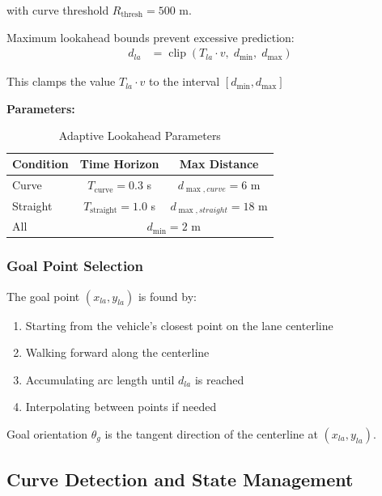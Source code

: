 \documentclass[12pt]{article}
\begin{document}
with curve threshold $R_{\text{thresh}} = 500$ m.

Maximum lookahead bounds prevent excessive prediction:
\begin{equation}
\begin{split}
d_{la} &= \operatorname{clip}\!\left(T_{la} \cdot v, \; d_{\min}, \; d_{\max}\right)
\end{split}
\end{equation}

This clamps the value \(T_{la} \cdot v\) to the interval \([d_{\min},d_{\max}]\)

\textbf{Parameters:}
\begin{table}[H]
\centering
\begin{tabular}{lcc}
\toprule
\textbf{Condition} & \textbf{Time Horizon} & \textbf{Max Distance} \\
\midrule
Curve & $T_{\text{curve}} = 0.3$ s & $d_{\max,curve} = 6$ m \\
Straight & $T_{\text{straight}} = 1.0$ s & $d_{\max,straight} = 18$ m \\
\midrule
All & \multicolumn{2}{c}{$d_{\min} = 2$ m} \\
\bottomrule
\end{tabular}
\caption{Adaptive Lookahead Parameters}
\end{table}

\subsubsection{Goal Point Selection}

The goal point $(x_{la}, y_{la})$ is found by:
\begin{enumerate}
    \item Starting from the vehicle's closest point on the lane centerline
    \item Walking forward along the centerline
    \item Accumulating arc length until $d_{la}$ is reached
    \item Interpolating between points if needed
\end{enumerate}

Goal orientation $\theta_g$ is the tangent direction of the centerline at $(x_{la}, y_{la})$.

\subsection{Curve Detection and State Management}
\end{document}
